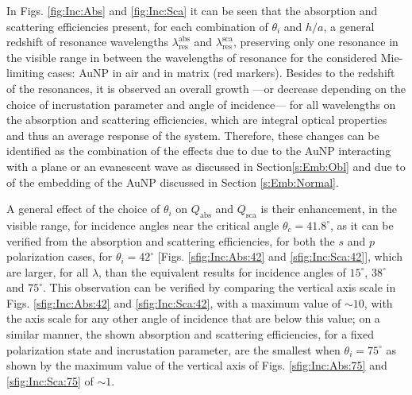 In Figs. \ref{fig:Inc:Abs} and \ref{fig:Inc:Sca} it can be seen that the absorption and scattering efficiencies present, for each combination of $\theta_i$ and $h/a$, a general redshift of resonance wavelengths $\lambda_\text{res}^\text{abs}$ and $\lambda_\text{res}^\text{sca}$, preserving only one resonance in the visible range in between the  wavelengths of resonance for the considered Mie-limiting cases: AuNP in air and in matrix (red markers). Besides to the redshift of the resonances, it is observed an overall growth ---or decrease depending on the choice of incrustation parameter and angle of incidence--- for all wavelengths on the absorption and scattering efficiencies, which are integral optical properties and thus an average response of the system. Therefore, these changes can be identified as the combination of the effects due to  due to the AuNP interacting with a plane or an evanescent wave as discussed in Section\ref{s:Emb:Obl} and due to of the embedding of the AuNP discussed in Section \ref{s:Emb:Normal}.

A general effect of the choice of $\theta_i$ on $Q_\text{abs}$ and $Q_\text{sca}$ is their enhancement, in the visible range, for incidence angles near the critical angle $\theta_c = 41.8^\circ$, as it can be verified from the absorption and scattering efficiencies, for both the $s$ and $p$ polarization cases, for $\theta_i = 42^\circ$ [Figs. \ref{sfig:Inc:Abs:42} and \ref{sfig:Inc:Sca:42}], which are larger, for all $\lambda$, than the equivalent results for incidence angles of $15^\circ$, $38^\circ$ and $75^\circ$. This observation can be verified by comparing the vertical axis scale in Figs. \ref{sfig:Inc:Abs:42} and \ref{sfig:Inc:Sca:42}, with a maximum value of $\sim 10$, with the axis scale for any other angle of incidence that are below this value; on a similar manner, the shown absorption and scattering efficiencies, for a fixed polarization state and incrustation parameter, are the smallest when $\theta_i = 75^\circ$ as shown by the maximum value of the vertical axis of  Figs. \ref{sfig:Inc:Abs:75} and \ref{sfig:Inc:Sca:75} of $\sim 1$.

